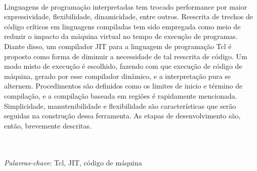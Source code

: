 \\
Linguagens de programação interpretadas tem trocado performance por
maior expressividade, flexibilidade, dinamicidade, entre outros.
Reescrita de trechos de código críticos em linguagens compiladas tem
sido empregada como meio de reduzir o impacto da máquina virtual no
tempo de execução de programas. Diante disso, um compilador JIT para a
linguagem de programação Tcl é proposto como forma de diminuir a
necessidade de tal reescrita de código. Um modo misto de execução é
escolhido, fazendo com que execução de código de máquina, gerado por
esse compilador dinâmico, e a interpretação pura se
alternem. Procedimentos são definidos como os limites de inicio e
término de compilação, e a compilação baseada em regiões é rapidamente
mencionada. Simplicidade, manutenibilidade e flexibilidade são
características que serão seguidas na construção dessa ferramenta.
As etapas de desenvolvimento são, então, brevemente descritas.

\quad\\
\quad\\
\textit{Palavras-chave}: Tcl, JIT, código de máquina
